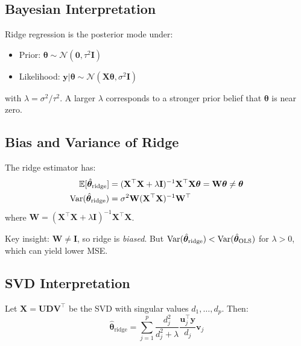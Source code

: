 \documentclass[main.tex]{subfiles}
\begin{document}
\subsection{Bayesian Interpretation}

Ridge regression is the posterior mode under:
\begin{itemize}
    \item Prior: $\boldsymbol{\theta} \sim \mathcal{N}(\mathbf{0}, \tau^2\mathbf{I})$
    \item Likelihood: $\mathbf{y} | \boldsymbol{\theta} \sim \mathcal{N}(\mathbf{X}\boldsymbol{\theta}, \sigma^2\mathbf{I})$
\end{itemize}
with $\lambda = \sigma^2/\tau^2$. A larger $\lambda$ corresponds to a stronger prior belief that $\boldsymbol{\theta}$ is near zero.

\subsection{Bias and Variance of Ridge}

\begin{theorem}
The ridge estimator has:
\begin{align}
\mathbb{E}[\hat{\boldsymbol{\theta}}_{\text{ridge}}] &= (\mathbf{X}^\top\mathbf{X} + \lambda\mathbf{I})^{-1}\mathbf{X}^\top\mathbf{X}\boldsymbol{\theta} = \mathbf{W}\boldsymbol{\theta} \neq \boldsymbol{\theta} \\
\text{Var}(\hat{\boldsymbol{\theta}}_{\text{ridge}}) &= \sigma^2 \mathbf{W}(\mathbf{X}^\top\mathbf{X})^{-1}\mathbf{W}^\top
\end{align}
where $\mathbf{W} = (\mathbf{X}^\top\mathbf{X} + \lambda\mathbf{I})^{-1}\mathbf{X}^\top\mathbf{X}$.
\end{theorem}

Key insight: $\mathbf{W} \neq \mathbf{I}$, so ridge is \textit{biased}. But $\text{Var}(\hat{\boldsymbol{\theta}}_{\text{ridge}}) < \text{Var}(\hat{\boldsymbol{\theta}}_{\text{OLS}})$ for $\lambda > 0$, which can yield lower MSE.

\subsection{SVD Interpretation}

Let $\mathbf{X} = \mathbf{U}\mathbf{D}\mathbf{V}^\top$ be the SVD with singular values $d_1, \ldots, d_p$. Then:
$$\hat{\boldsymbol{\theta}}_{\text{ridge}} = \sum_{j=1}^{p} \frac{d_j^2}{d_j^2 + \lambda} \frac{\mathbf{u}_j^\top\mathbf{y}}{d_j}\mathbf{v}_j$$
\end{document}
